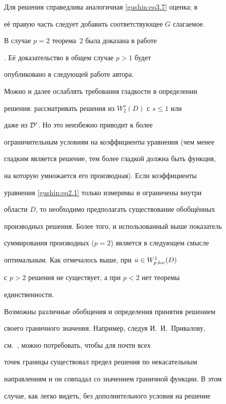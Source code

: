 \smallskip



Для решения справедлива аналогичная \eqref{gushin:eq3.7} оценка; в

её правую часть следует добавить соответствующее $G$ слагаемое.



В случае $p = 2$ теорема~2 была доказана в работе

\cite{gushin:GM91}. Её доказательство в общем случае $p > 1$ будет

опубликовано в следующей работе автора.



Можно и далее ослаблять требования гладкости в определении

решения: рассматривать решения из $W_2^s(D)$ с $s \leq 1$  или

даже из ${\cal D}'$. Но это неизбежно приводит к более

ограничительным условиям на коэффициенты уравнения (чем менее

гладким является решение, тем более гладкой должна быть функция,

на которую умножается его производная). Если коэффициенты

уравнения \eqref{gushin:eq2.1} только измеримы и ограничены внутри

области $D$, то необходимо предполагать существование обобщённых

производных решения. Более того, и использованный выше показатель

суммирования производных (${p = 2}$) является в следующем смысле

оптимальным. Как отмечалось выше, при $u \in W_{p,{\rm loc}}^1(D)$

с $p > 2$ решения не существует, а при $p < 2$ нет теоремы

единственности.



Возможны различные обобщения и определения принятия решением

своего граничного значения. Например, следуя И.~И.~Привалову,

см.~\cite{gushin:Priv}, можно потребовать, чтобы для почти всех

точек границы существовал предел решения по некасательным

направлениям и он совпадал со значением граничной функции. В этом

случае, как легко видеть, без дополнительного условия на решение

